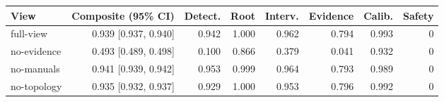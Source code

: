 \begin{tabular}{lrrrrrrr}
\toprule
View & Composite (95\% CI) & Detect. & Root & Interv. & Evidence & Calib. & Safety \\
\midrule
full-view & 0.939 [0.937, 0.940] & 0.942 & 1.000 & 0.962 & 0.794 & 0.993 & 0 \\
no-evidence & 0.493 [0.489, 0.498] & 0.100 & 0.866 & 0.379 & 0.041 & 0.932 & 0 \\
no-manuals & 0.941 [0.939, 0.942] & 0.953 & 0.999 & 0.964 & 0.793 & 0.989 & 0 \\
no-topology & 0.935 [0.932, 0.937] & 0.929 & 1.000 & 0.953 & 0.796 & 0.992 & 0 \\
\bottomrule
\end{tabular}
